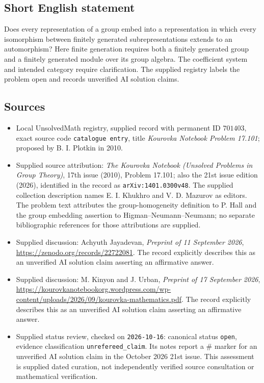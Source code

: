 \documentclass[11pt]{article}
\begin{document}
\subsection{Short English statement}
Does every representation of a group embed into a representation in which every isomorphism between finitely generated subrepresentations extends to an automorphism? Here finite generation requires both a finitely generated group and a finitely generated module over its group algebra. The coefficient system and intended category require clarification. The supplied registry labels the problem open and records unverified AI solution claims.
\subsection{Sources}
\begin{itemize}
\item Local UnsolvedMath registry, supplied record with permanent ID \(701403\), exact source code \texttt{catalogue entry}, title \emph{Kourovka Notebook Problem 17.101}; proposed by B. I. Plotkin in 2010.
\item Supplied source attribution: \emph{The Kourovka Notebook (Unsolved Problems in Group Theory)}, 17th issue (2010), Problem 17.101; also the 21st issue edition (2026), identified in the record as \texttt{arXiv:1401.0300v48}. The supplied collection description names E. I. Khukhro and V. D. Mazurov as editors. The problem text attributes the group-homogeneity definition to P. Hall and the group embedding assertion to Higman--Neumann--Neumann; no separate bibliographic references for those attributions are supplied.
\item Supplied discussion: Achyuth Jayadevan, \emph{Preprint of 11 September 2026}, \url{https://zenodo.org/records/22722081}. The record explicitly describes this as an unverified AI solution claim asserting an affirmative answer.
\item Supplied discussion: M. Kinyon and J. Urban, \emph{Preprint of 17 September 2026}, \url{https://kourovkanotebookorg.wordpress.com/wp-content/uploads/2026/09/kourovka-mathematics.pdf}. The record explicitly describes this as an unverified AI solution claim asserting an affirmative answer.
\item Supplied status review, checked on \texttt{2026-10-16}: canonical status \texttt{open}, evidence classification \texttt{unrefereed\_claim}. Its notes report a \(\#\) marker for an unverified AI solution claim in the October 2026 21st issue. This assessment is supplied dated curation, not independently verified source consultation or mathematical verification.
\end{itemize}
\end{document}
